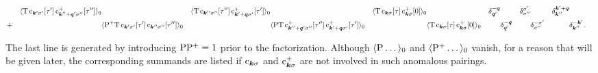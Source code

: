 \begin{align*}
        && \langle\mathrm T \, \mathrm c_{\boldsymbol k' \sigma'}[\tau']
        \, \mathrm c_{\boldsymbol k'' + \boldsymbol q' \sigma''}^+[\tau'']\rangle_0
        && \langle\mathrm T \, \mathrm c_{\boldsymbol k'' \sigma''}[\tau'']
        \, \mathrm c_{\boldsymbol k' + \boldsymbol q \sigma'}^+[\tau']\rangle_0
        && \langle\mathrm T \, \mathrm c_{\boldsymbol k \sigma}[\tau]
        \, \mathrm c_{\boldsymbol k \sigma}^+[0]\rangle_0
        && \delta_{\boldsymbol q'}^{-\boldsymbol q}
        && \delta_{\sigma''}^{\sigma'}
        && \delta_{\boldsymbol k''}^{\boldsymbol k' + \boldsymbol q} \\
        &+
        && \langle\mathrm P^+ \mathrm T \, \mathrm c_{\boldsymbol k' \sigma'}[\tau']
        \, \mathrm c_{\boldsymbol k'' \sigma''}[\tau'']\rangle_0
        && \langle\mathrm P \mathrm T \, \mathrm c_{\boldsymbol k'' + \boldsymbol q' \sigma''}^+[\tau'']
        \, \mathrm c_{\boldsymbol k' + \boldsymbol q \sigma'}^+[\tau']\rangle_0
        && \langle\mathrm T \, \mathrm c_{\boldsymbol k \sigma}[\tau]
        \, \mathrm c_{\boldsymbol k \sigma}^+[0]\rangle_0
        && \delta_{\boldsymbol q'}^{-\boldsymbol q}
        && \delta_{\sigma''}^{-\sigma'}
        && \delta_{\boldsymbol k''}^{-\boldsymbol k'}.
    \end{align*}
\endgroup

The last line is generated by introducing $\mathrm P \mathrm P^+ = 1$ prior to the
factorization. Although $\langle\mathrm P \dots\rangle_0$ and $\langle\mathrm P^+ \dots\rangle_0$ vanish,
for a reason that will be given later, the corresponding summands are listed if
$\mathrm c_{\boldsymbol k \sigma}$ and $\mathrm c_{\boldsymbol k \sigma}^+$ are not involved in such
anomalous pairings.

